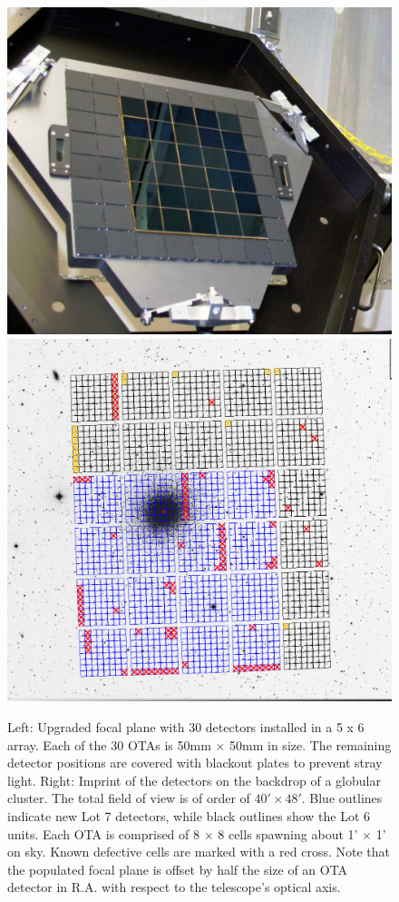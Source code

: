 \documentclass[]{spieman}
\begin{document}
\begin{figure}
	\centering
	\hfill
	\includegraphics[height=0.4\textwidth]{images/detectorsOnFocalPlane5x6.jpg}
	\hfill
	\includegraphics[height=0.4\textwidth]{images/5ODI_Imprint.png}
	\hfill \\[1ex]
	
	\caption{\label{fig_focalplane} Left: Upgraded focal plane with 30 detectors
    installed in a 5 x 6 array. Each of the 30 OTAs is 50mm $\times$ 50mm in size.
    The remaining detector positions are covered with blackout plates to prevent
    stray light. Right: Imprint of the detectors on the backdrop of a globular
    cluster. The total field of view is of order of $40' \times 48'$.  Blue
    outlines indicate new Lot 7 detectors, while black outlines show the Lot 6
    units. Each OTA is comprised of 8  $\times$ 8 cells spawning about 1' $\times$
    1' on sky. Known defective cells are marked with a red cross. Note that the
    populated focal plane is offset by half the size of an OTA detector in R.A.
    with respect to the telescope's optical axis. }
\end{figure}
\end{document}
